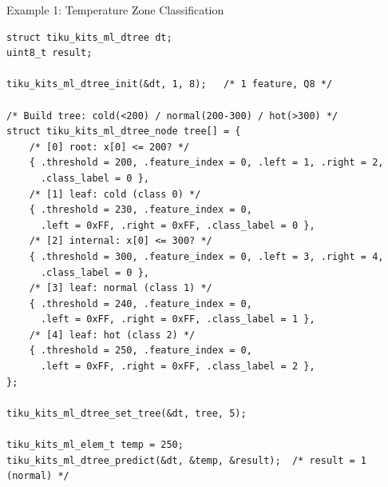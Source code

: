\documentclass[aspectratio=169, 10pt]{beamer}
\begin{document}
\begin{frame}[fragile]{Example 1: Temperature Zone Classification}
\begin{lstlisting}[style=cstyle,
  title={examples/example\_ml\_dtree.c --- 3-class temperature zones}]
struct tiku_kits_ml_dtree dt;
uint8_t result;

tiku_kits_ml_dtree_init(&dt, 1, 8);   /* 1 feature, Q8 */

/* Build tree: cold(<200) / normal(200-300) / hot(>300) */
struct tiku_kits_ml_dtree_node tree[] = {
    /* [0] root: x[0] <= 200? */
    { .threshold = 200, .feature_index = 0, .left = 1, .right = 2,
      .class_label = 0 },
    /* [1] leaf: cold (class 0) */
    { .threshold = 230, .feature_index = 0,
      .left = 0xFF, .right = 0xFF, .class_label = 0 },
    /* [2] internal: x[0] <= 300? */
    { .threshold = 300, .feature_index = 0, .left = 3, .right = 4,
      .class_label = 0 },
    /* [3] leaf: normal (class 1) */
    { .threshold = 240, .feature_index = 0,
      .left = 0xFF, .right = 0xFF, .class_label = 1 },
    /* [4] leaf: hot (class 2) */
    { .threshold = 250, .feature_index = 0,
      .left = 0xFF, .right = 0xFF, .class_label = 2 },
};

tiku_kits_ml_dtree_set_tree(&dt, tree, 5);

tiku_kits_ml_elem_t temp = 250;
tiku_kits_ml_dtree_predict(&dt, &temp, &result);  /* result = 1 (normal) */
\end{lstlisting}
\end{frame}
\end{document}
